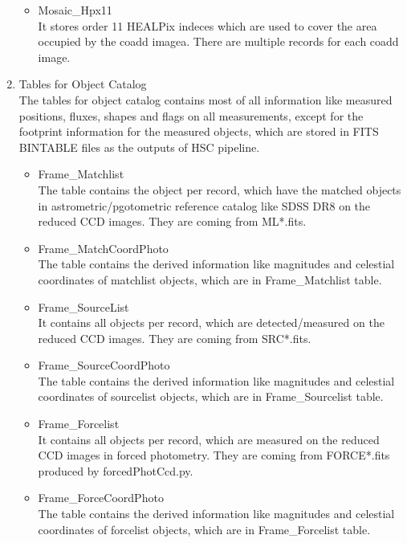 \documentclass[12pt]{article}
\begin{document}
\begin{enumerate}
\begin{itemize}
\item Mosaic\_Hpx11\\
It stores order 11 HEALPix indeces which are used to cover the area occupied by the coadd imagea. 
There are multiple records for each coadd image.  

\end{itemize}

\item Tables for Object Catalog\\
The tables for object catalog contains most of all information like measured positions, fluxes, shapes and 
flags on all measurements, except for the footprint information for the measured objects, which are stored 
in FITS BINTABLE files as the outputs of HSC pipeline.   

\begin{itemize}

\item Frame\_Matchlist\\
The table contains the object per record, which have the matched objects in astrometric/pgotometric 
reference catalog like SDSS DR8 on the reduced CCD images. They are coming from ML*.fits. 

\item Frame\_MatchCoordPhoto\\
The table contains the derived information like magnitudes and celestial coordinates of matchlist 
objects, which are in Frame\_Matchlist table. 

\item Frame\_SourceList\\
It contains all objects per record, which are detected/measured on the reduced CCD images. They 
are coming from SRC*.fits. 

\item Frame\_SourceCoordPhoto\\
The table contains the derived information like magnitudes and celestial coordinates of sourcelist 
objects, which are in Frame\_Sourcelist table. 

\item Frame\_Forcelist\\
It contains all objects per record, which are measured on the reduced CCD images in forced photometry. 
They are coming from FORCE*.fits produced by forcedPhotCcd.py. 

\item Frame\_ForceCoordPhoto\\
The table contains the derived information like magnitudes and celestial coordinates of forcelist 
objects, which are in Frame\_Forcelist table. 


\end{itemize}
\end{enumerate}
\end{document}
